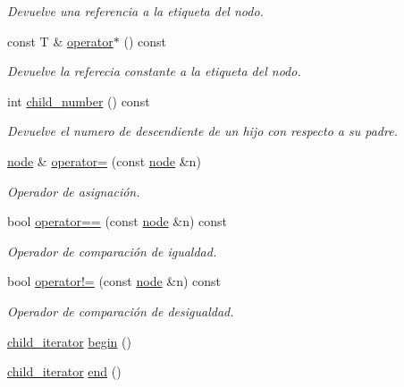 \begin{DoxyCompactItemize}
\begin{DoxyCompactList}\small\item\em Devuelve una referencia a la etiqueta del nodo. \end{DoxyCompactList}\item 
const T \& \hyperlink{classktree_1_1node_ad42692f55219307c42ced0bf8fa4b2ab}{operator$\ast$} () const 
\begin{DoxyCompactList}\small\item\em Devuelve la referecia constante a la etiqueta del nodo. \end{DoxyCompactList}\item 
int \hyperlink{classktree_1_1node_add148132388c783f372259cbcbfd7e9d}{child\+\_\+number} () const 
\begin{DoxyCompactList}\small\item\em Devuelve el numero de descendiente de un hijo con respecto a su padre. \end{DoxyCompactList}\item 
\hyperlink{classktree_1_1node}{node} \& \hyperlink{classktree_1_1node_a383fa7826c041ad5f7d6341a2e21a942}{operator=} (const \hyperlink{classktree_1_1node}{node} \&n)
\begin{DoxyCompactList}\small\item\em Operador de asignación. \end{DoxyCompactList}\item 
bool \hyperlink{classktree_1_1node_a1bbacc93d551c420c116cd8c3e271311}{operator==} (const \hyperlink{classktree_1_1node}{node} \&n) const 
\begin{DoxyCompactList}\small\item\em Operador de comparación de igualdad. \end{DoxyCompactList}\item 
bool \hyperlink{classktree_1_1node_a9c59f7d2389e3306cade4c6cd6bfb515}{operator!=} (const \hyperlink{classktree_1_1node}{node} \&n) const 
\begin{DoxyCompactList}\small\item\em Operador de comparación de desigualdad. \end{DoxyCompactList}\item 
\hyperlink{classktree_1_1node_1_1child__iterator}{child\+\_\+iterator} \hyperlink{classktree_1_1node_ab1d94976dda6df402ea1c4281cb3679a}{begin} ()
\item 
\hyperlink{classktree_1_1node_1_1child__iterator}{child\+\_\+iterator} \hyperlink{classktree_1_1node_adcca94414cd6a337bddf153eb88fa044}{end} ()
\end{DoxyCompactItemize}
